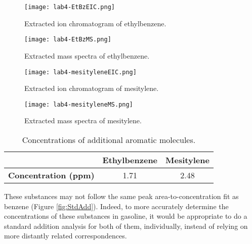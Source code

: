 \documentclass[../labs.tex]{subfiles}
\begin{document}
\begin{figure}[H]
    \centering
    \texttt{[image: lab4-EtBzEIC.png]}
    \caption{Extracted ion chromatogram of ethylbenzene.}
    \label{fig:EtBzEIC}
\end{figure}

\begin{figure}[H]
    \centering
    \texttt{[image: lab4-EtBzMS.png]}
    \caption{Extracted mass spectra of ethylbenzene.}
    \label{fig:EtBzMS}
\end{figure}

\begin{figure}[H]
    \centering
    \texttt{[image: lab4-mesityleneEIC.png]}
    \caption{Extracted ion chromatogram of mesitylene.}
    \label{fig:mesityleneEIC}
\end{figure}

\begin{figure}[H]
    \centering
    \texttt{[image: lab4-mesityleneMS.png]}
    \caption{Extracted mass spectra of mesitylene.}
    \label{fig:mesityleneMS}
\end{figure}

\begin{table}[H]
    \centering
    \small
    \renewcommand{\arraystretch}{1.2}
    \begin{tabular}{|c|c|c|}
        \hline
         & \textbf{Ethylbenzene} & \textbf{Mesitylene}\\
        \hline
        \textbf{Concentration (ppm)} & \num{1.71} & \num{2.48}\\
        \hline
    \end{tabular}
    \caption{Concentrations of additional aromatic molecules.}
    \label{tab:EtBzMesityleneConc}
\end{table}
These substances may not follow the same peak area-to-concentration fit as benzene (Figure \ref{fig:StdAdd}). Indeed, to more accurately determine the concentrations of these substances in gasoline, it would be appropriate to do a standard addition analysis for both of them, individually, instead of relying on more distantly related correspondences.
\setcounter{figure}{0}
\setcounter{table}{0}
\end{document}
